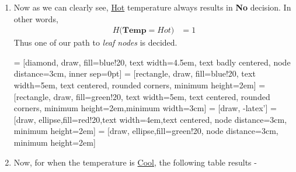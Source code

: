 \documentclass[11pt]{article}
\begin{document}
\begin{enumerate}
	\item 
Now as we can clearly see, \underline{Hot} temperature always results in \textbf{No} decision. In other words,
\begin{align*}
	H\big(\textbf{Temp}=Hot\big) &= 1
\end{align*}
 Thus one of our path to \textit{leaf nodes} is decided.

 = [diamond, draw, fill=blue!20, 
text width=4.5em, text badly centered, node distance=3cm, inner sep=0pt]
 = [rectangle, draw, fill=blue!20, 
text width=5em, text centered, rounded corners, minimum height=2em]
 = [rectangle, draw, fill=green!20, 
text width=5em, text centered, rounded corners, minimum height=2em,minimum width=3cm]
 = [draw, -latex']
 = [draw, ellipse,fill=red!20,text width=4em,text centered, node distance=3cm,
minimum height=2em]
 = [draw, ellipse,fill=green!20, node distance=3cm,
minimum height=2em]
    \begin{center}
    \end{center}
\item Now, for when the temperature is \underline{Cool}, the following table results - 
\begin{table}[!ht]

\end{table}
\end{enumerate}
\end{document}
